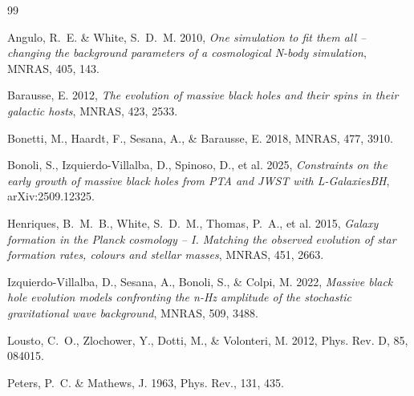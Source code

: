\documentclass[11pt,a4paper]{article}
\begin{document}
\begin{thebibliography}{99}

Angulo, R.~E. \& White, S.~D.~M. 2010,
\textit{One simulation to fit them all -- changing the background parameters of a cosmological N-body simulation},
MNRAS, 405, 143.

Barausse, E. 2012,
\textit{The evolution of massive black holes and their spins in their galactic hosts},
MNRAS, 423, 2533.

Bonetti, M., Haardt, F., Sesana, A., \& Barausse, E. 2018,
MNRAS, 477, 3910.

Bonoli, S., Izquierdo-Villalba, D., Spinoso, D., et al. 2025,
\textit{Constraints on the early growth of massive black holes from PTA and JWST with L-GalaxiesBH},
arXiv:2509.12325.

Henriques, B.~M.~B., White, S.~D.~M., Thomas, P.~A., et al. 2015,
\textit{Galaxy formation in the Planck cosmology -- I. Matching the observed evolution of star formation rates, colours and stellar masses},
MNRAS, 451, 2663.

Izquierdo-Villalba, D., Sesana, A., Bonoli, S., \& Colpi, M. 2022,
\textit{Massive black hole evolution models confronting the n-Hz amplitude of the stochastic gravitational wave background},
MNRAS, 509, 3488.

Lousto, C.~O., Zlochower, Y., Dotti, M., \& Volonteri, M. 2012,
Phys. Rev. D, 85, 084015.

Peters, P.~C. \& Mathews, J. 1963, Phys. Rev., 131, 435.

\end{thebibliography}
\end{document}
